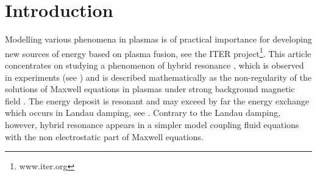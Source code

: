 \section{Introduction}
Modelling various phenomena in plasmas is of practical importance for developing new sources of energy 
based on plasma fusion, see the ITER project\footnote{www.iter.org}. 
This article concentrates on studying a phenomenon of hybrid resonance \cite{Stix}, 
which is observed in experiments (see \cite{reflectometers_2006, reflectometers_2010, Dumont_2005}) and is described
mathematically as the non-regularity of
the solutions of Maxwell equations in plasmas under strong background magnetic field \cite{Despres_2014}. 
The energy deposit is resonant and may exceed by far the energy 
exchange which occurs in Landau damping, see \cite{Freidberg_2007}. 
Contrary to the Landau damping, however, 
hybrid resonance appears in a simpler model coupling 
fluid equations with the non electrostatic part of Maxwell equations.


